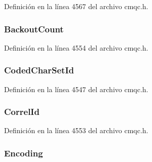 Definición en la línea 4567 del archivo cmqc.\+h.

\hypertarget{structtag_m_q_m_d1_afd269725e61f1620f8182ccd914d8dae}{}
\subsubsection[{Backout\+Count}]{ Backout\+Count}\label{structtag_m_q_m_d1_afd269725e61f1620f8182ccd914d8dae}


Definición en la línea 4554 del archivo cmqc.\+h.

\hypertarget{structtag_m_q_m_d1_a4d8d1961a991850d1355cdf9b4680b8e}{}
\subsubsection[{Coded\+Char\+Set\+Id}]{ Coded\+Char\+Set\+Id}\label{structtag_m_q_m_d1_a4d8d1961a991850d1355cdf9b4680b8e}


Definición en la línea 4547 del archivo cmqc.\+h.

\hypertarget{structtag_m_q_m_d1_acac8d73138c2c618b41a274eb92e5f2a}{}
\subsubsection[{Correl\+Id}]{ Correl\+Id}\label{structtag_m_q_m_d1_acac8d73138c2c618b41a274eb92e5f2a}


Definición en la línea 4553 del archivo cmqc.\+h.

\hypertarget{structtag_m_q_m_d1_a30167bf454a49a60fd3fe4e9e586af34}{}
\subsubsection[{Encoding}]{ Encoding}\label{structtag_m_q_m_d1_a30167bf454a49a60fd3fe4e9e586af34}



